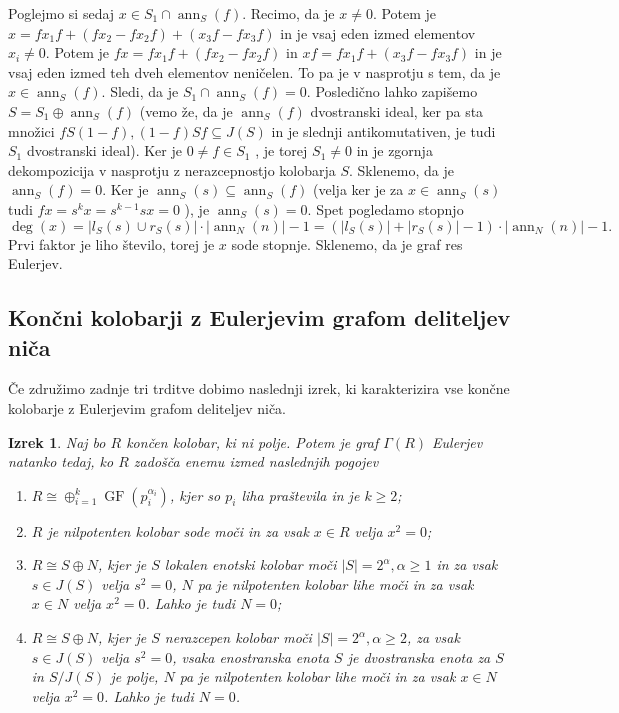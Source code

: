 \documentclass[a4paper, 12pt]{amsart}
\theoremstyle{definition} %
\theoremstyle{plain} %
\newtheorem{izrek}[definicija]{Izrek}
\DeclareMathOperator{\ann}{ann}
\DeclareMathOperator{\GF}{GF}
\begin{document}
Poglejmo si sedaj $x\in S_1 \cap \ann_S(f) $. Recimo, da je $x\neq0 $. Potem je $x = fx_1 f + (fx_2 - fx_2 f) + (x_3 f - fx_3 f)$ in je vsaj eden izmed elementov $x_i \neq 0$. Potem je $fx = fx_1 f + (fx_2 - fx_2 f ) $ in $xf = fx_1f + (x_3f - fx_3f)$ in je vsaj eden izmed teh dveh elementov neničelen. To pa je v nasprotju s tem, da je $x\in \ann_S(f)$. Sledi, da je $S_1 \cap \ann_S(f) = 0$. Posledično lahko zapišemo $S = S_1 \oplus \ann_S(f)$ (vemo že, da je $\ann_S(f)$ dvostranski ideal, ker pa sta množici $fS(1-f),(1-f)Sf \subseteq J(S) $ in je slednji antikomutativen, je tudi $S_1$ dvostranski ideal). Ker je $0\neq f\in S_1$ , je torej $S_1\neq 0$ in je zgornja dekompozicija v nasprotju z nerazcepnostjo kolobarja $S$. Sklenemo, da je $\ann_S(f) = 0$. Ker je $\ann_S(s) \subseteq \ann_S(f)$ (velja ker je za $x\in \ann_S(s)$ tudi $fx = s^k x = s^{k-1 } sx = 0$ ), je $\ann_S(s) = 0$. Spet pogledamo stopnjo
$$
\deg(x) = |l_S(s) \cup r_S(s)|\cdot |\ann_N(n)|-1 = (|l_S(s) | + |r_S(s)|-1)\cdot |\ann_N(n)| - 1.
$$
Prvi faktor je liho število, torej je $x$ sode stopnje. Sklenemo, da je graf res Eulerjev.

\endproof


\subsection{Končni kolobarji z Eulerjevim grafom deliteljev niča}

Če združimo zadnje tri trditve dobimo naslednji izrek, ki karakterizira vse končne kolobarje z Eulerjevim grafom deliteljev niča.

\begin{izrek}
\label{EulerGraf}
Naj bo $R$ končen kolobar, ki ni polje. Potem je graf $\Gamma(R)$ Eulerjev natanko tedaj, ko $R$ zadošča enemu izmed naslednjih pogojev
\begin{enumerate}
\item $R \cong \oplus_{i=1}^k \GF(p_i^{\alpha_i})$, kjer so $p_i$ liha praštevila in je $k\ge 2$;
\item $R$ je nilpotenten kolobar sode moči in za vsak $x\in R$ velja $x^2 = 0$;
\item $R\cong S\oplus N$, kjer je $S$ lokalen enotski kolobar moči $|S| = 2^{\alpha}, \alpha \ge 1$ in za vsak $s\in J(S)$ velja $s^2 = 0$, $N$ pa je nilpotenten kolobar lihe moči in za vsak $x\in N$ velja $x^2 = 0$. Lahko je tudi $N=0$;
\item $R\cong S \oplus N$, kjer je $S$ nerazcepen kolobar moči $|S| = 2^{\alpha}, \alpha \ge 2$, za vsak $s\in J(S)$ velja $s^2 = 0$, vsaka enostranska enota $S$ je dvostranska enota za $S$ in $S/J(S)$ je polje, $N$ pa je nilpotenten kolobar lihe moči in za vsak $x\in N$ velja $x^2 = 0$. Lahko je tudi $N=0$.
\end{enumerate} 
\end{izrek}
\end{document}
